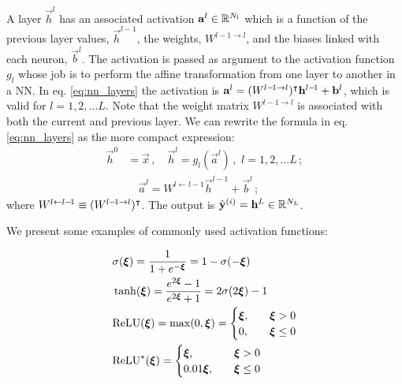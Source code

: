     A layer $\vec{h}^l$ has an associated activation $\vec{a}^l \in \RR[N_l]$ which is a function of the previous layer values, $\vec{h}^{l-\!1}$, the weights, $W^{l-\!1\to l}$, and the biases linked with each neuron, $\vec{b}^l$. The activation is passed as argument to the activation function $g_l$ whose job is to perform the affine transformation from one layer to another in a NN. In eq. \eqref{eq:nn_layers} the activation is $\vec{a}^l = (W^{l-\! 1\to l})\TT\vec{h}^{l -\!1} + \vec{b}^l$, which is valid for $l= 1, 2,\dots L$. Note that the weight matrix $W^{l-\! 1\to l}$ is associated with both the current and previous layer. We can rewrite the formula in eq. \eqref{eq:nn_layers} as the more compact expression:
    \begin{equation}
        \begin{split}
            \vec{h}^0 &= \vec{x} \,,\quad \vec{h}^l =  g_l(\vec{a}^l)\,, \, \, l=1,2, \dots L \,; \\
            &\quad \vec{a}^l = W^{l\leftarrow l-\!1}\vec{h}^{l -\!1} + \vec{b}^l \,;
        \end{split}
    \end{equation}
    where $W^{l\leftarrow l-\!1} \equiv (W^{l-\! 1\to l})\TT$. The output is $\hat{\vec{y}}^{(i)} = \vec{h}^L \in \RR[N_L]$.

    We present some examples of commonly used activation functions:

    \begin{subequations}\label{eq:activation_functions}
        \begin{align}
            &\sigma(\svec{\xi}) = \frac{1}{1+e^{-\svec{\xi}}} = 1- \sigma(-\svec{\xi})\label{eq:sigmoid}\\
            &\tanh(\svec{\xi}) = \frac{e^{2\svec{\xi}}-1}{e^{2\svec{\xi}}+1} = 2\sigma(2\svec{\xi}) -1\label{eq:tanh} \\
            &\mathrm{ReLU}(\svec{\xi}) = \max(0,\svec{\xi}) = \begin{cases}
                \svec{\xi},\quad &\svec{\xi} >0 \\
                0,\quad &\svec{\xi} \leq 0
            \end{cases} \label{eq:relu}\\
            &\mathrm{ReLU}^*(\svec{\xi})  = \begin{cases}
                \svec{\xi},\quad &\svec{\xi} >0 \\
                0.01\svec{\xi},\quad &\svec{\xi} \leq 0
            \end{cases} \label{eq:leaky_relu}
        \end{align}
    \end{subequations}

